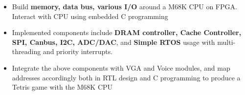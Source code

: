 \documentclass[10pt,a4paper,ragged2e,withhyper]{altacv}
\begin{document}
\begin{paracol}{2}
\divider

\begin{itemize}
\item Build \textbf{memory, data bus, various I/O} around a M68K CPU on FPGA. Interact with CPU using embedded C programming
\item Implemented components include \textbf{DRAM controller, Cache Controller, SPI, Canbus, I2C, ADC/DAC}, and \textbf{Simple RTOS} usage with multi-threading and priority interrupts.
\item Integrate the above components with VGA and Voice modules, and map addresses accordingly both in RTL design and C programming to produce a Tetris game with the M68K CPU
\end{itemize}



\medskip







\end{paracol}
\end{document}
